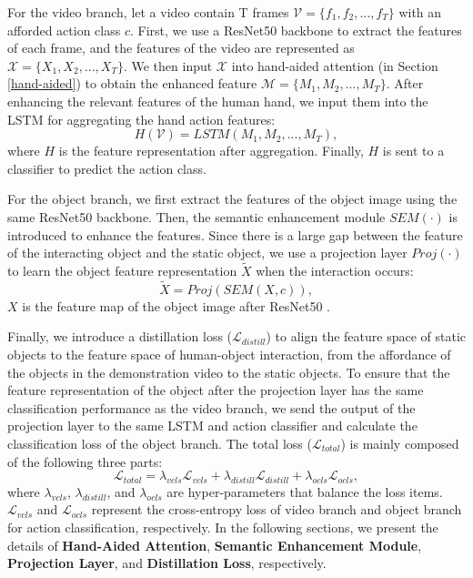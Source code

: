 \documentclass[journal,twoside]{IEEEtran}
\begin{document}
\par For the video branch, let a video contain T frames $\mathcal{V}=\{f_{1},f_{2},...,f_{T}\}$ with an afforded action class $c$. First, we use a ResNet50 \cite{DBLP:conf/cvpr/HeZRS16} backbone to extract the features of each frame, and the features of the video are represented as $\mathcal{X}=\{X_{1},X_{2},...,X_{T}\}$. We then input $\mathcal{X}$ into hand-aided attention (in Section \ref{hand-aided}) to obtain the enhanced feature $\mathcal{M}=\{M_{1},M_{2},...,M_{T}\}$. After enhancing the relevant features of the human hand, we input them into the LSTM \cite{hochreiter1997long} for aggregating the hand action features:
\begin{equation}
    H(\mathcal{V})=LSTM(M_{1},M_{2},...,M_{T}), \label{eq:no5}
\end{equation}
where $H$ is the feature representation after aggregation. Finally, $H$ is sent to a classifier to predict the action class. 

\par For the object branch, we first extract the features of the object image using the same ResNet50 backbone. Then, the semantic enhancement module $SEM(\cdot)$ is introduced to enhance the features. Since there is a large gap between the feature of the interacting object and the static object, we use a projection layer $Proj(\cdot)$ to learn the object feature representation $\tilde{X}$ when the interaction occurs:
\begin{equation}
    \tilde{X}=Proj(SEM(X,c)), \label{eq:no6}
\end{equation}
$X$ is the feature map of the object image after ResNet50 \cite{DBLP:conf/cvpr/HeZRS16}.

Finally, we introduce a distillation loss ($\mathcal{L}_{distill}$) to align the feature space of static objects to the feature space of human-object interaction, from the affordance of the objects in the demonstration video to the static objects. To ensure that the feature representation of the object after the projection layer has the same classification performance as the video branch, we send the output of the projection layer to the same LSTM and action classifier and calculate the classification loss of the object branch. The total loss ($\mathcal{L}_{total}$) is mainly composed of the following three parts:
\begin{equation}
   \mathcal{L}_{total}=\lambda_{vcls}\mathcal{L}_{vcls}+\lambda_{distill}\mathcal{L}_{distill}+\lambda_{ocls}\mathcal{L}_{ocls},  \label{eq:no18}
\end{equation}
where $\lambda_{vcls}$, $\lambda_{distill}$, and $\lambda_{ocls}$ are hyper-parameters that balance the loss items. $\mathcal{L}_{vcls}$ and $\mathcal{L}_{ocls}$ represent the cross-entropy loss of video branch and object branch for action classification, respectively. 
In the following sections, we present the details of \textbf{Hand-Aided Attention}, \textbf{Semantic Enhancement Module}, \textbf{Projection Layer}, and \textbf{Distillation Loss}, respectively.
\end{document}
